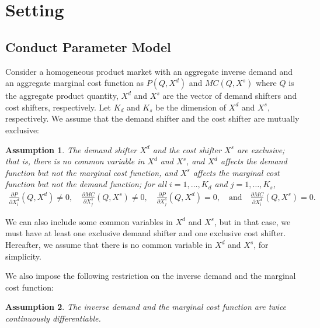 \documentclass[11pt, a4paper]{article}
\newtheorem{assumption}{Assumption}
\theoremstyle{remark}
\begin{document}
\section{Setting}\label{sec:setting}

\subsection{Conduct Parameter Model}\label{subsec:model_and_assumptions}

Consider a homogeneous product market with an aggregate inverse demand and an aggregate marginal cost function as $P(Q, X^{d})$ and $MC(Q, X^{s})$ where $Q$ is the aggregate product quantity, $X^{d}$ and $X^{s}$ are the vector of demand shifters and cost shifters, respectively.
Let $K_d$ and $K_s$ be the dimension of $X^{d}$ and $X^{s}$, respectively.
We assume that the demand shifter and the cost shifter are mutually exclusive:
\begin{assumption}\label{assumption:exclusive_shifters}
    The demand shifter $X^{d}$ and the cost shifter $X^{s}$ are exclusive; that is, there is no common variable in $X^{d}$ and $X^{s}$, and $X^{d}$ affects the demand function but not the marginal cost function, and $X^{s}$ affects the marginal cost function but not the demand function; for all $i = 1, \ldots, K_d$ and $j = 1, \ldots, K_s$,
    \begin{align}
        \frac{\partial P}{\partial X^{d}_{i}}(Q, X^{d}) \ne 0, \quad \frac{\partial MC}{\partial X^{s}_{j}}(Q, X^{s}) \ne 0, \quad \frac{\partial P}{\partial X^{s}_{j}}(Q, X^{d}) = 0, \quad \text{and} \quad \frac{\partial MC}{\partial X^{d}_{i}}(Q, X^{s}) = 0.
    \end{align}
\end{assumption}
We can also include some common variables in $X^{d}$ and $X^{s}$, but in that case, we must have at least one exclusive demand shifter and one exclusive cost shifter.
Hereafter, we assume that there is no common variable in $X^{d}$ and $X^{s}$, for simplicity.

We also impose the following restriction on the inverse demand and the marginal cost function:
\begin{assumption}\label{assumption:twice_differentiable}
    The inverse demand and the marginal cost function are twice continuously differentiable.
\end{assumption}
\end{document}
